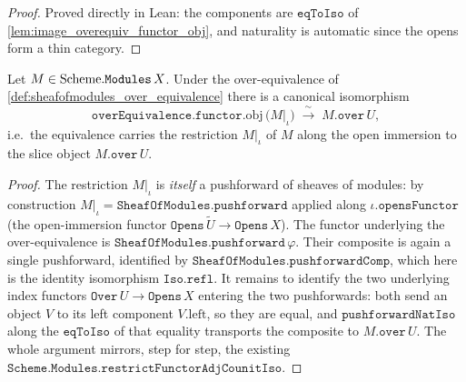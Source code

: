 \begin{proof}
  \leanok
  Proved directly in Lean: the components are \(\mathtt{eqToIso}\) of
  \cref{lem:image_overequiv_functor_obj}, and naturality is automatic since the opens
  form a thin category.
\end{proof}

\begin{lemma}\leanok
  \label{lem:sheafofmodules_restrict_over_iso}
  Let \(M \in \mathrm{Scheme}.\mathtt{Modules}\,X\). Under the over-equivalence of
  \cref{def:sheafofmodules_over_equivalence} there is a canonical isomorphism
  \[
    \mathtt{overEquivalence}.\mathtt{functor}.\mathrm{obj}\,\bigl(M|_\iota\bigr)
      \;\xrightarrow{\ \sim\ }\;
    M.\mathtt{over}\,U,
  \]
  i.e.\ the equivalence carries the restriction \(M|_\iota\) of \(M\) along the
  open immersion to the slice object \(M.\mathtt{over}\,U\).
\end{lemma}

\begin{proof}
  \leanok
  The restriction \(M|_\iota\) is \emph{itself} a pushforward of sheaves of
  modules: by construction \(M|_\iota = \mathtt{SheafOfModules.pushforward}\)
  applied along \(\iota.\mathtt{opensFunctor}\) (the open-immersion functor
  \(\mathtt{Opens}\,\widetilde{U} \to \mathtt{Opens}\,X\)). The functor underlying
  the over-equivalence is \(\mathtt{SheafOfModules.pushforward}\,\varphi\). Their
  composite is again a single pushforward, identified by
  \(\mathtt{SheafOfModules.pushforwardComp}\), which here is the identity
  isomorphism \(\mathtt{Iso.refl}\). It remains to identify the two underlying
  index functors \(\mathtt{Over}\,U \to \mathtt{Opens}\,X\) entering the two
  pushforwards: both send an object \(V\) to its left component \(V.\mathrm{left}\),
  so they are equal, and \(\mathtt{pushforwardNatIso}\) along the \(\mathtt{eqToIso}\)
  of that equality transports the composite to \(M.\mathtt{over}\,U\). The whole
  argument mirrors, step for step, the existing
  \(\mathtt{Scheme.Modules.restrictFunctorAdjCounitIso}\).
\end{proof}

